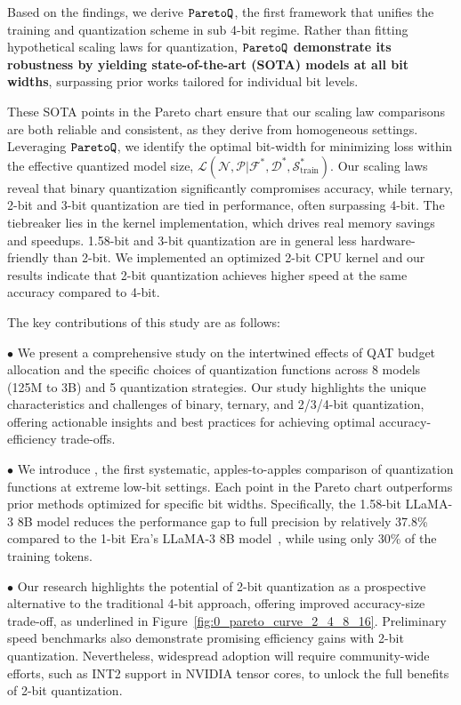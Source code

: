 Based on the findings, we derive $\texttt{ParetoQ}{}$, the first framework that unifies the training and quantization scheme in sub 4-bit regime. Rather than fitting hypothetical scaling laws for quantization,\textbf{ $\texttt{ParetoQ}{}$ demonstrate its robustness by yielding state-of-the-art (SOTA) models at all bit widths}, surpassing prior works tailored for individual bit levels. 

These SOTA points in the Pareto chart ensure that our scaling law comparisons are both reliable and consistent, as they derive from homogeneous settings. Leveraging $\texttt{ParetoQ}{}$, we identify the optimal bit-width for minimizing loss within the effective quantized model size, $\mathcal{L}(\mathcal{N}, \mathcal{P} | \mathcal{F}^*, \mathcal{D}^*, \mathcal{S}_{\text{train}}^*)$. Our scaling laws reveal that binary quantization significantly compromises accuracy, while ternary, 2-bit and 3-bit quantization are tied in performance, often surpassing 4-bit. 
The tiebreaker lies in the kernel implementation, which drives real memory savings and speedups. 1.58-bit and 3-bit quantization are in general less hardware-friendly than 2-bit. We implemented an optimized 2-bit CPU kernel and our results indicate that 2-bit quantization achieves higher speed at the same accuracy compared to 4-bit.

The key contributions of this study are as follows: 

$\bullet$ We present a comprehensive study on the intertwined effects of QAT budget allocation and the specific choices of quantization functions across 8 models (125M to 3B) and 5 quantization strategies. Our study highlights the unique characteristics and challenges of binary, ternary, and 2/3/4-bit quantization, offering actionable insights and best practices for achieving optimal accuracy-efficiency trade-offs. 
    
$\bullet$  We introduce \ours{}, the first systematic, apples-to-apples comparison of quantization functions at extreme low-bit settings. Each point in the Pareto chart outperforms prior methods optimized for specific bit widths. Specifically, the 1.58-bit \ours{} LLaMA-3 8B model reduces the performance gap to full precision by relatively 37.8\% compared to the 1-bit Era's LLaMA-3 8B model~\cite{ma2024era}, while using only 30\% of the training tokens. 

$\bullet$ Our research highlights the potential of 2-bit quantization as a prospective alternative to the traditional 4-bit approach, offering improved accuracy-size trade-off, as underlined in Figure~\ref{fig:0_pareto_curve_2_4_8_16}. Preliminary speed benchmarks also demonstrate promising efficiency gains with 2-bit quantization. Nevertheless, widespread adoption will require community-wide efforts, such as INT2 support in NVIDIA tensor cores, to unlock the full benefits of 2-bit quantization. 